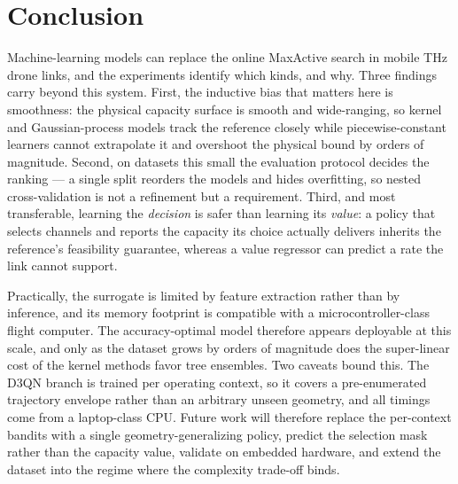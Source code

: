 \documentclass[journal]{IEEEtran}
\begin{document}
\section{Conclusion}
Machine-learning models can replace the online MaxActive search in mobile THz drone
links, and the experiments identify which kinds, and why. Three findings carry beyond
this system. First, the inductive bias that matters here is smoothness: the physical
capacity surface is smooth and wide-ranging, so kernel and Gaussian-process models track
the reference closely while piecewise-constant learners cannot extrapolate it and
overshoot the physical bound by orders of magnitude. Second, on datasets this small the
evaluation protocol decides the ranking --- a single split reorders the models and hides
overfitting, so nested cross-validation is not a refinement but a requirement. Third, and
most transferable, learning the \emph{decision} is safer than learning its \emph{value}:
a policy that selects channels and reports the capacity its choice actually delivers
inherits the reference's feasibility guarantee, whereas a value regressor can predict a
rate the link cannot support.

Practically, the surrogate is limited by feature extraction rather than by inference, and
its memory footprint is compatible with a microcontroller-class flight computer. The
accuracy-optimal model therefore appears deployable at this scale, and only as the dataset
grows by orders of magnitude does the super-linear cost of the kernel methods favor tree
ensembles.
Two caveats bound this. The D3QN branch is trained per operating context, so it covers a
pre-enumerated trajectory envelope rather than an arbitrary unseen geometry, and all
timings come from a laptop-class CPU. Future work will therefore replace the per-context
bandits with a single geometry-generalizing policy, predict the selection mask rather than
the capacity value, validate on embedded hardware, and extend the dataset into the regime
where the complexity trade-off binds.
\end{document}
